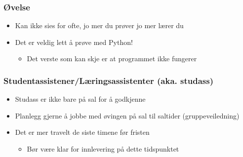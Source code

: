 \documentclass[screen, aspectratio=169]{beamer}
\begin{document}
\begin{frame}
	\frametitle{Øvelse}
	\begin{itemize}
		\item Kan ikke sies for ofte, jo mer du prøver jo mer lærer du
		\item Det er veldig lett å prøve med Python!
		\begin{itemize}
			\item Det verste som kan skje er at programmet ikke fungerer
		\end{itemize}
	\end{itemize}
\end{frame}

\begin{frame}
	\frametitle{Studentassistener/\allowbreak Læringsassistenter (aka. studass)}
	\begin{itemize}
		\item Studass er ikke bare på sal for å godkjenne
		\item Planlegg gjerne å jobbe med øvingen på sal til saltider (gruppeveiledning)
		\item Det er mer travelt de siste timene før fristen
		\begin{itemize}
			\item Bør være klar for innlevering på dette tidspunktet
		\end{itemize}
	\end{itemize}
\end{frame}
\end{document}
